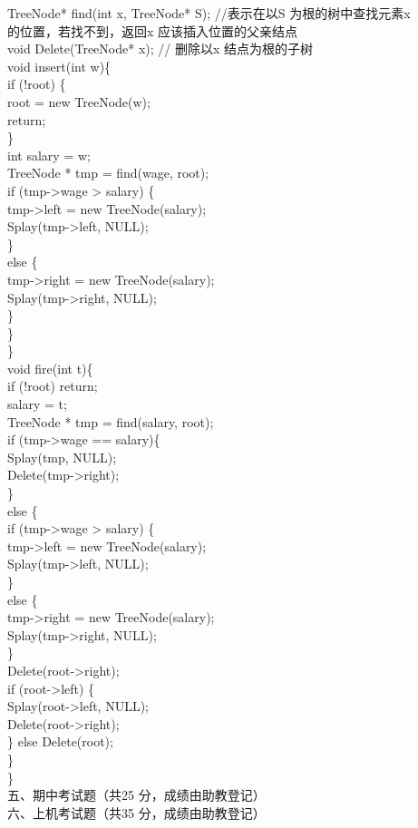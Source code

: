 \begin{question}
TreeNode* find(int x, TreeNode* S);  //表示在以S 为根的树中查找元素x\\
的位置，若找不到，返回x 应该插入位置的父亲结点\\
void Delete(TreeNode* x); // 删除以x 结点为根的子树\\
void insert(int w)\{\\
if (!root) \{\\
root = new TreeNode(w);\\
return;\\
\}\\
int salary = w;\\
TreeNode * tmp = find(wage, root);\\
if (tmp->wage > salary) \{\\
tmp->left = new TreeNode(salary);\\
Splay(tmp->left, NULL);\\
\}\\
else \{\\
tmp->right = new TreeNode(salary);\\
Splay(tmp->right, NULL);\\
\}\\
\}\\
\}\\
void fire(int t)\{\\
if (!root) return;\\
salary = t;\\
TreeNode * tmp = find(salary, root);\\
if (tmp->wage == salary)\{\\
Splay(tmp, NULL);\\
Delete(tmp->right);\\
\}\\
else \{\\
if (tmp->wage > salary) \{\\
tmp->left = new TreeNode(salary);\\
Splay(tmp->left, NULL);\\
\}\\
else \{\\
tmp->right = new TreeNode(salary);\\
Splay(tmp->right, NULL);\\
\}\\
Delete(root->right);\\
if (root->left) \{\\
Splay(root->left, NULL);\\
Delete(root->right);\\
\} else Delete(root);\\
\}\\
\}\\
五、期中考试题（共25 分，成绩由助教登记）\\
六、上机考试题（共35 分，成绩由助教登记）\\
\\
\


\end{question}
